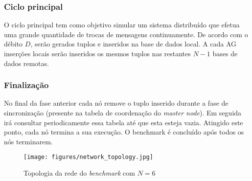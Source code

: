 \subsubsection*{Ciclo principal}
O ciclo principal tem como objetivo simular um sistema distribuído que efetua uma grande quantidade de trocas de mensagens continuamente. 
De acordo com o débito $D$, serão gerados tuplos e inseridos na base de dados local. A cada AG inserções locais serão inseridos os mesmos tuplos nas restantes $N - 1$ bases de dados remotas.

\subsubsection*{Finalização}
No final da fase anterior cada nó remove o tuplo inserido durante a fase de sincronização (presente na tabela de coordenação do \textit{master node}). Em seguida irá consultar periodicamente essa tabela até que esta esteja vazia. Atingido este ponto, cada nó termina a sua execução. O benchmark é concluído após todos os nós terminarem.

\begin{figure}[h!]
	\centering
	\texttt{[image: figures/network\_topology.jpg]}
	\caption{Topologia da rede do \textit{benchmark} com $N=6$}
	\label{topologia}
\end{figure}


